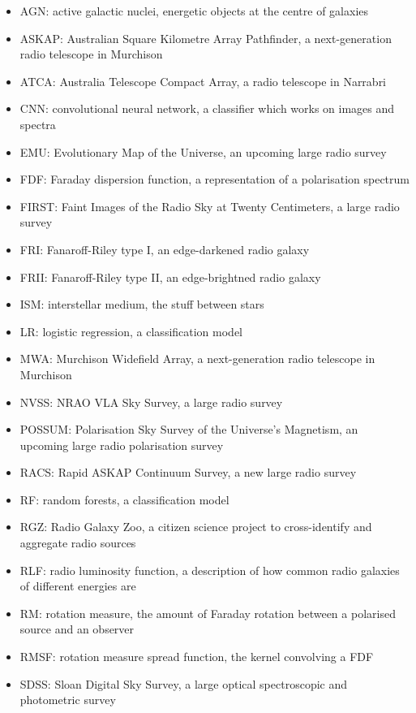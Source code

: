 \begin{itemize}
    \item AGN: active galactic nuclei, energetic objects at the centre of galaxies
    \item ASKAP: Australian Square Kilometre Array Pathfinder, a next-generation radio telescope in Murchison
    \item ATCA: Australia Telescope Compact Array, a radio telescope in Narrabri
    \item CNN: convolutional neural network, a classifier which works on images and spectra
    \item EMU: Evolutionary Map of the Universe, an upcoming large radio survey
    \item FDF: Faraday dispersion function, a representation of a polarisation spectrum
    \item FIRST: Faint Images of the Radio Sky at Twenty Centimeters, a large radio survey
    \item FRI: Fanaroff-Riley type I, an edge-darkened radio galaxy
    \item FRII: Fanaroff-Riley type II, an edge-brightned radio galaxy
    \item ISM: interstellar medium, the stuff between stars
    \item LR: logistic regression, a classification model
    \item MWA: Murchison Widefield Array, a next-generation radio telescope in Murchison
    \item NVSS: NRAO VLA Sky Survey, a large radio survey
    \item POSSUM: Polarisation Sky Survey of the Universe's Magnetism, an upcoming large radio polarisation survey
    \item RACS: Rapid ASKAP Continuum Survey, a new large radio survey
    \item RF: random forests, a classification model
    \item RGZ: Radio Galaxy Zoo, a citizen science project to cross-identify and aggregate radio sources
    \item RLF: radio luminosity function, a description of how common radio galaxies of different energies are
    \item RM: rotation measure, the amount of Faraday rotation between a polarised source and an observer
    \item RMSF: rotation measure spread function, the kernel convolving a FDF
    \item SDSS: Sloan Digital Sky Survey, a large optical spectroscopic and photometric survey

\end{itemize}
